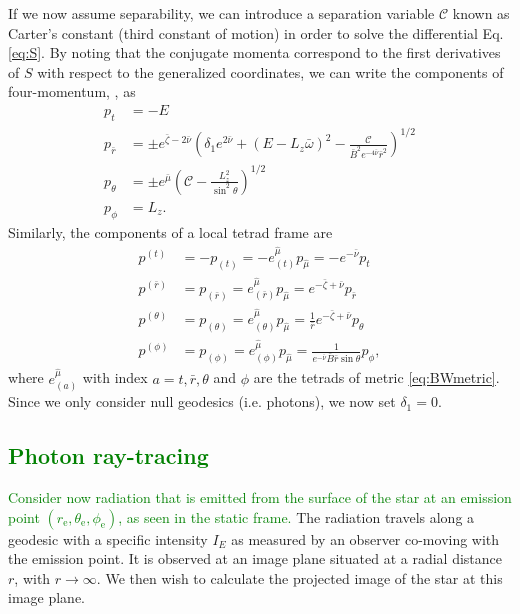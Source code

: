 \documentclass{aa}
\makeatletter
\def\fvec#1{\underline{\sbox\tw@{$#1$}\dp\tw@\z@\box\tw@}}
\newcommand{\refe}[1]{\textcolor{green}{{#1}}}
\newcommand{\Ca}{\ensuremath{\mathcal{C}}}
\newcommand{\rb}{\ensuremath{\bar{r}}}
\newcommand{\wb}{\ensuremath{\bar{\omega}}}
\newcommand{\nub}{\ensuremath{\bar{\nu}}}
\newcommand{\zetab}{\ensuremath{\bar{\zeta}}}
\newcommand{\Bb}{\ensuremath{\bar{B}}}
\newcommand{\mub}{\ensuremath{\bar{\mu}}}
\makeatother
\begin{document}
If we now assume separability, we can introduce a separation variable $\Ca$ known as Carter's constant (third constant of motion) in order to solve the differential Eq. \eqref{eq:S}.  
By noting that the conjugate momenta correspond to the first derivatives of $S$ with respect to the generalized coordinates, we can write the components of four-momentum, \fvec{p}, as 
\begin{align}
  p_t        &= -E \label{eq:p_t}\\
  p_{\rb}    &= \pm e^{\zetab - 2\nub} \left( \delta_1 e^{2\nub} + (E - L_z \wb)^2 - \frac{\Ca}{\Bb^2 e^{-4\nub} \rb^2} \right)^{1/2}\label{eq:p_r}\\
  p_{\theta} &= \pm e^{\mub} \left( \Ca - \frac{L_z^2}{\sin^2\theta} \right)^{1/2}\label{eq:p_the}\\
  p_{\phi}   &= L_z\label{eq:p_p}.
\end{align}
Similarly, the components of a local tetrad frame are
\begin{align}
  p^{(t)} &= -p_{(t)} = -e_{(t)}^{\hat{\mu}} p_{\hat{\mu}} = -e^{-\nub}p_t \label{eq:tetp_t}\\
  p^{(\rb)} &= p_{(\rb)} = e_{(\rb)}^{\hat{\mu}} p_{\hat{\mu}} = e^{-\zetab + \nub} p_{\rb} \label{eq:tetp_r}\\
  p^{(\theta)} &= p_{(\theta)} = e_{(\theta)}^{\hat{\mu}} p_{\hat{\mu}} = \frac{1}{\rb} e^{-\zetab+\nub} p_{\theta} \label{eq:tetp_theta}\\
  p^{(\phi)} &= p_{(\phi)} = e_{(\phi)}^{\hat{\mu}} p_{\hat{\mu}} = \frac{1}{e^{-\nub} \Bb \rb \sin\theta} p_{\phi} \label{eq:tetp_phi},
\end{align}
where $e^{\hat{\mu}}_{(a)}$ with index $a = t, \rb, \theta$ and $\phi$ are the tetrads of metric \eqref{eq:BWmetric}.
Since we only consider null geodesics (i.e. photons), we now set $\delta_1 = 0$.

\subsection{\refe{Photon ray-tracing}}\label{sect:raytracing}
\refe{Consider now radiation that is emitted from the surface of the star at an emission point $(r_{\mathrm{e}},\theta_{\mathrm{e}},\phi_{\mathrm{e}})$, as seen in the static frame.}
The radiation travels along a geodesic with a specific intensity $I_{E}$ as measured by an observer co-moving with the emission point.  
It is observed at an image plane situated at a radial distance $r$, with $r\rightarrow\infty$.  
We then wish to calculate the projected image of the star at this image plane.
\end{document}
